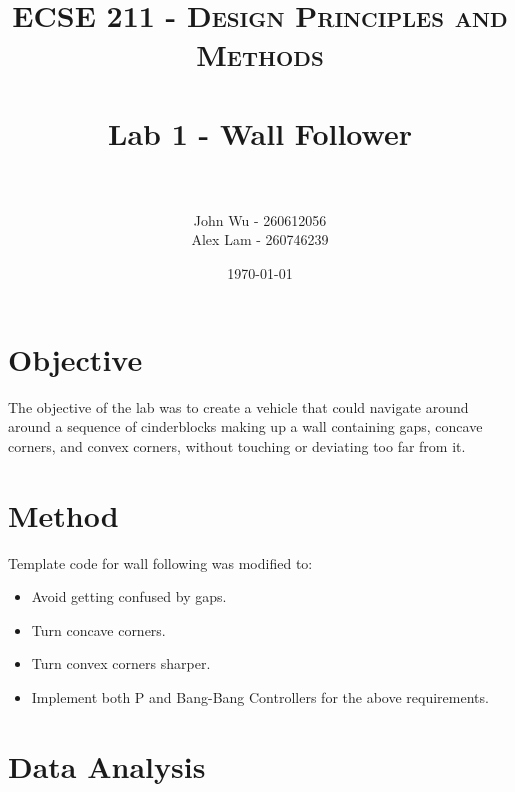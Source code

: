 \documentclass[paper=a4, fontsize=11pt]{scrartcl}
\title{
		\usefont{OT1}{bch}{b}{n}
		\normalfont \normalsize \textsc{ECSE 211 - Design Principles and Methods} \\ [25pt]
		\horrule{0.5pt} \\[0.4cm]
		\huge Lab 1 - Wall Follower \\
		\horrule{2pt} \\[0.5cm]
}
\author{John Wu - 260612056 \\ Alex Lam - 260746239}
\date{\today}
\begin{document}
 
\maketitle
 
\section{Objective}

The objective of the lab was to create a vehicle that could navigate around around a sequence of cinderblocks making up a wall containing gaps, concave corners, and convex corners, without touching or deviating too far from it.
 
\section{Method}
 
Template code for wall following was modified to:

\begin{itemize}
  \item Avoid getting confused by gaps.
  \item Turn concave corners.
  \item Turn convex corners sharper.
  \item Implement both P and Bang-Bang Controllers for the above requirements.
\end{itemize}
 
\section{Data Analysis}
\end{document}
